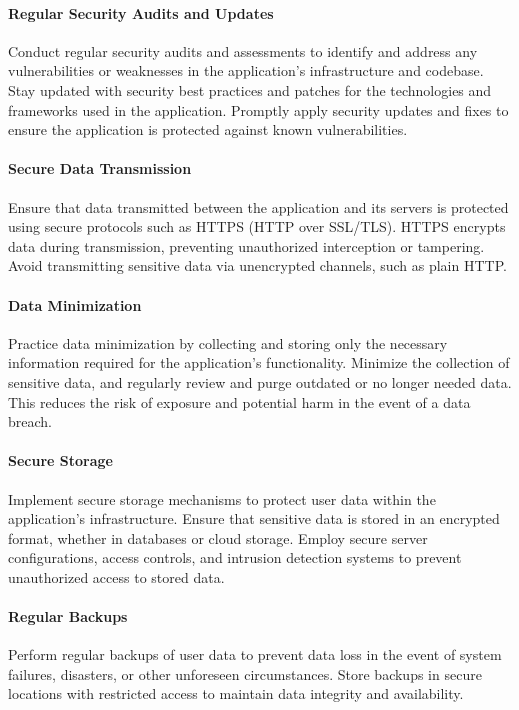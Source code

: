 \paragraph{Regular Security Audits and Updates}
Conduct regular security audits and assessments to identify and address any 
vulnerabilities or weaknesses in the application's infrastructure and codebase. Stay updated with security best 
practices and patches for the technologies and frameworks used in the application. Promptly apply security updates 
and fixes to ensure the application is protected against known vulnerabilities.

\paragraph{Secure Data Transmission}
Ensure that data transmitted between the application and its servers is protected using 
secure protocols such as HTTPS (HTTP over SSL/TLS). HTTPS encrypts data during transmission, preventing unauthorized 
interception or tampering. Avoid transmitting sensitive data via unencrypted channels, such as plain HTTP.

\paragraph{Data Minimization}
Practice data minimization by collecting and storing only the necessary information required for 
the application's functionality. Minimize the collection of sensitive data, and regularly review and purge outdated 
or no longer needed data. This reduces the risk of exposure and potential harm in the event of a data breach.

\paragraph{Secure Storage}
Implement secure storage mechanisms to protect user data within the application's infrastructure. 
Ensure that sensitive data is stored in an encrypted format, whether in databases or cloud storage. Employ secure 
server configurations, access controls, and intrusion detection systems to prevent unauthorized access to stored data.

\paragraph{Regular Backups}
Perform regular backups of user data to prevent data loss in the event of system failures, 
disasters, or other unforeseen circumstances. Store backups in secure locations with restricted access to 
maintain data integrity and availability.

